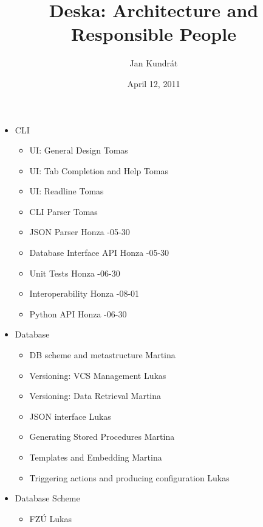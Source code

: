 \documentclass{article}
\begin{document}
\title{Deska: Architecture and Responsible People}

\author{Jan Kundrát}

\date{April 12, 2011}

\maketitle

\TabPositions{12cm,14cm}

\begin{itemize}
    \item CLI
        \begin{itemize}
            \item UI: General Design \tab Tomas
            \item UI: Tab Completion and Help \tab Tomas
            \item UI: Readline \tab Tomas
            \item CLI Parser \tab Tomas
            \item JSON Parser \tab Honza -05-30
            \item Database Interface API \tab Honza -05-30
            \item Unit Tests \tab Honza -06-30
            \item Interoperability \tab Honza -08-01
            \item Python API \tab Honza -06-30
        \end{itemize}
    \item Database
        \begin{itemize}
            \item DB scheme and metastructure \tab Martina
            \item Versioning: VCS Management \tab Lukas
            \item Versioning: Data Retrieval \tab Martina
            \item JSON interface \tab Lukas
            \item Generating Stored Procedures \tab Martina
            \item Templates and Embedding \tab Martina
            \item Triggering actions and producing configuration \tab Lukas
        \end{itemize}
    \item Database Scheme
        \begin{itemize}
            \item FZÚ \tab Lukas

\end{itemize}
\end{itemize}
\end{document}
